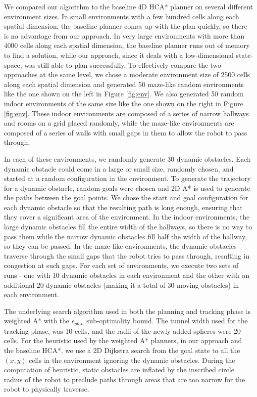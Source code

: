 We compared our algorithm to the baseline 4D HCA* planner on several different environment sizes. In small environments with a few hundred cells along each spatial dimension, the baseline planner comes up with the plan quickly, so there is no advantage from our approach. In very large environments with more than 4000 cells along each spatial dimension, the baseline planner runs out of memory to find a solution, while our approach, since it deals with a low-dimensional state-space, was still able to plan successfully. To effectively compare the two approaches at the same level, we chose a moderate environment size of 2500 cells along each spatial dimension and generated 50 maze-like random environments like the one shown on the left in Figure \ref{fig:env}. We also generated 50 random indoor environments of the same size like the one shown on the right in Figure \ref{fig:env}. These indoor environments are composed of a series of narrow hallways and rooms on a grid placed randomly, while the maze-like environments are composed of a series of walls with small gaps in them to allow the robot to pass through.

In each of these environments, we randomly generate 30 dynamic obstacles. Each dynamic obstacle could come in a large or small size, randomly chosen, and started at a random configuration in the environment. To generate the trajectory for a dynamic obstacle, random goals were chosen and 2D A* is used to generate the paths between the goal points. We chose the start and goal configuration for each dynamic obstacle so that the resulting path is long enough, ensuring that they cover a significant area of the environment. In the indoor environments, the large dynamic obstacles fill the entire width of the hallways, so there is no way to pass them while the narrow dynamic obstacles fill half the width of the hallway, so they can be passed. In the maze-like environments, the dynamic obstacles traverse through the small gaps that the robot tries to pass through, resulting in congestion at such gaps. For each set of environments, we execute two sets of runs - one with 10 dynamic obstacles in each environment and the other with an additional 20 dynamic obstacles (making it a total of 30 moving obstacles) in each environment.

The underlying search algorithm used in both the planning and tracking phase is weighted A* with the $\epsilon_{plan}$ sub-optimality bound. The tunnel width used for the tracking phase, was 10 cells, and the radii of the newly added spheres were 20 cells. For the heuristic used by the weighted A* planners, in our approach and the baseline HCA*, we use a 2D Dijkstra search from the goal state to all the $(x,y)$ cells in the environment ignoring the dynamic obstacles. During the computation of heuristic, static obstacles are inflated by the inscribed circle radius of the robot to preclude paths through areas that are too narrow for the robot to physically traverse. 


